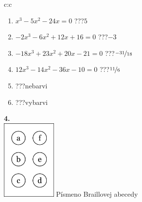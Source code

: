 \documentclass[10pt]{report}
\begin{document}
\begin{tabular}{c:c}
\begin{minipage}[c][104.5mm][t]{0.5\linewidth}
\begin{center}
\begin{minipage}{0.79\linewidth}
\begin{center}
\begin{varwidth}{\linewidth}
\begin{enumerate}
\Large
\item $x^3-5x^2-24x=0$\quad \dotfill\; ???\;\dotfill \quad $5$
\item $-2x^3-6x^2+12x+16=0$\quad \dotfill\; ???\;\dotfill \quad $-3$
\item $-18x^3+23x^2+20x-21=0$\quad \dotfill\; ???\;\dotfill \quad $\nicefrac{-31}{18}$
\item $12x^3-14x^2-36x-10=0$\quad \dotfill\; ???\;\dotfill \quad $\nicefrac{11}{6}$
\item \quad \dotfill\; ???\;\dotfill \quad nebarvi
\item \quad \dotfill\; ???\;\dotfill \quad vybarvi
\end{enumerate}
\end{varwidth}
\end{center}
\end{minipage}
\begin{minipage}{0.20\linewidth}
\begin{center}
{\Huge\bfseries 4.} \\[2mm]
\includegraphics[height=40mm]{../images/braille.png}
{\small Písmeno Braillovej abecedy}
\end{center}
\end{minipage}
\end{center}
\end{minipage}
%
\end{tabular}
\newpage
\thispagestyle{empty}
\end{document}
